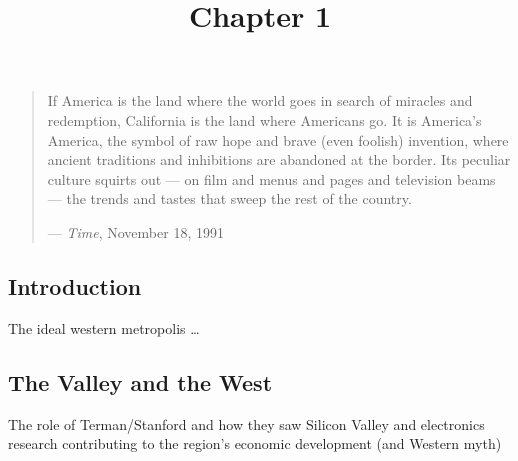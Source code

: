 \documentclass[11pt,article,oneside]{memoir}
\title{\bigskip \bigskip Chapter 1}
\author{\bigskip\Large }
\begin{document}
  

\setsansfont[Mapping=tex-text, BoldFont={* Bold SemiCondensed}, ItalicFont={* Semibold SemiCondensed Italic}]{Myriad Pro}
\setmonofont[Mapping=tex-text,Scale=MatchLowercase]{Consolas}


\setsansfont[Mapping=tex-text]{Minion Pro} 
\setmonofont[Mapping=tex-text,Scale=0.8]{Consolas}
\pagestyle{kjh}


\maketitle


\begin{quote}
If America is the land where the world goes in search of miracles and
redemption, California is the land where Americans go. It is America's
America, the symbol of raw hope and brave (even foolish) invention,
where ancient traditions and inhibitions are abandoned at the border.
Its peculiar culture squirts out --- on film and menus and pages and
television beams --- the trends and tastes that sweep the rest of the
country.

--- \emph{Time}, November 18, 1991
\end{quote}

\subsection{Introduction}

The ideal western metropolis \ldots{}

\subsection{The Valley and the West}

The role of Terman/Stanford and how they saw Silicon Valley and
electronics research contributing to the region's economic development
(and Western myth)
\end{document}
